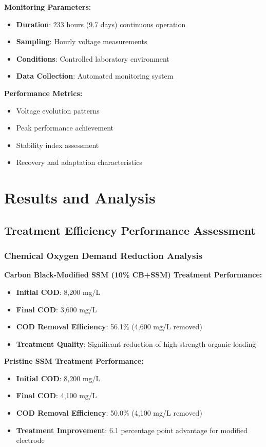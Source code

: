\documentclass[12pt,a4paper]{article}
\begin{document}
\textbf{Monitoring Parameters:}
\begin{itemize}
    \item \textbf{Duration}: 233 hours (9.7 days) continuous operation
    \item \textbf{Sampling}: Hourly voltage measurements
    \item \textbf{Conditions}: Controlled laboratory environment
    \item \textbf{Data Collection}: Automated monitoring system
\end{itemize}

\textbf{Performance Metrics:}
\begin{itemize}
    \item Voltage evolution patterns
    \item Peak performance achievement
    \item Stability index assessment
    \item Recovery and adaptation characteristics
\end{itemize}

\section{Results and Analysis}

\subsection{Treatment Efficiency Performance Assessment}

\subsubsection{Chemical Oxygen Demand Reduction Analysis}

\textbf{Carbon Black-Modified SSM (10\% CB+SSM) Treatment Performance:}
\begin{itemize}
    \item \textbf{Initial COD}: 8,200 mg/L
    \item \textbf{Final COD}: 3,600 mg/L
    \item \textbf{COD Removal Efficiency}: 56.1\% (4,600 mg/L removed)
    \item \textbf{Treatment Quality}: Significant reduction of high-strength organic loading
\end{itemize}

\textbf{Pristine SSM Treatment Performance:}
\begin{itemize}
    \item \textbf{Initial COD}: 8,200 mg/L
    \item \textbf{Final COD}: 4,100 mg/L
    \item \textbf{COD Removal Efficiency}: 50.0\% (4,100 mg/L removed)
    \item \textbf{Treatment Improvement}: 6.1 percentage point advantage for modified electrode
\end{itemize}
\end{document}
